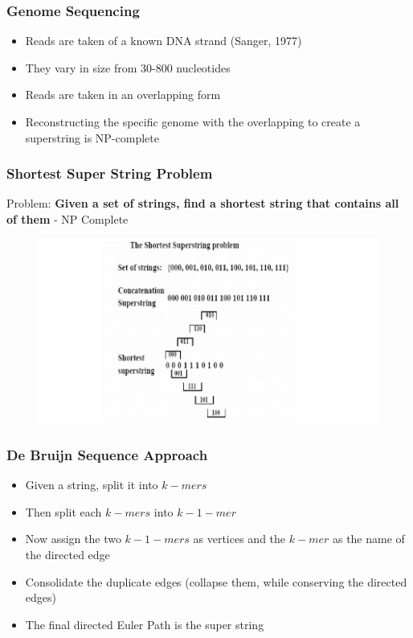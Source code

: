 \documentclass{beamer}
\begin{document}

\begin{frame}
\frametitle{Genome Sequencing}
\begin{itemize}
\item Reads are taken of a known DNA strand (Sanger, 1977)
\item They vary in size from 30-800 nucleotides
\item Reads are taken in an overlapping form
\item Reconstructing the specific genome with the overlapping to create a superstring is NP-complete
\end{itemize}
\end{frame}


\begin{frame}
\frametitle{Shortest Super String Problem}
Problem: \textbf{Given a set of strings, find a shortest string that contains all of them} - NP Complete
\begin{figure}[h]
\includegraphics[scale = 0.4]{ssexample.png}
\end{figure}
\end{frame}


\begin{frame}
\frametitle{De Bruijn Sequence Approach}
\begin{itemize}
\item Given a string, split it into $k-mers$
\pause
\item Then split each $k-mers$ into $k-1-mer$
\pause
\item Now assign the two $k-1-mers$ as vertices and the $k-mer$ as the name of the directed edge
\pause
\item Consolidate the duplicate edges (collapse them, while conserving the directed edges)
\pause
\item The final directed Euler Path is the super string
\end{itemize}
\end{frame}
\end{document}
